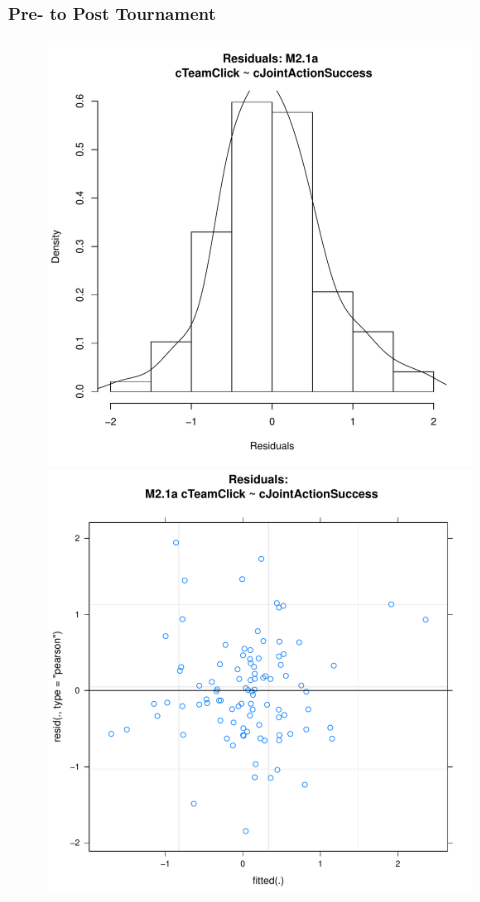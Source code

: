  \subsubsection{Pre- to Post Tournament}

 


 \begin{figure}[htbp]
   \includegraphics[scale =.4]{images/MLM21aHist.pdf}
   \includegraphics[scale =.4]{images/MLM21aScatter.pdf}

\end{figure}
